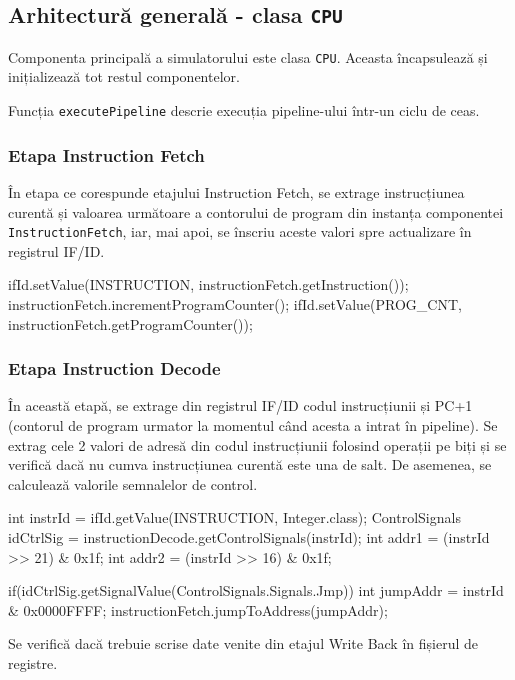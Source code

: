 \documentclass{article}
\begin{document}
\subsection{Arhitectură generală - clasa \texttt{CPU}}
Componenta principală a simulatorului este clasa \texttt{CPU}. Aceasta încapsulează și inițializează tot restul componentelor. 

Funcția \texttt{executePipeline} descrie execuția pipeline-ului într-un ciclu de ceas. 

\subsubsection{Etapa Instruction Fetch}
În etapa ce corespunde etajului Instruction Fetch, se extrage instrucțiunea curentă și valoarea următoare a contorului de program din instanța componentei \texttt{InstructionFetch}, iar, mai apoi, se înscriu aceste valori  spre actualizare în registrul IF/ID.

\begin{javacodebox}[Etajul If]
ifId.setValue(INSTRUCTION, instructionFetch.getInstruction());
instructionFetch.incrementProgramCounter();
ifId.setValue(PROG_CNT, instructionFetch.getProgramCounter());
\end{javacodebox}

\subsubsection{Etapa Instruction Decode}
În această etapă, se extrage din registrul IF/ID codul instrucțiunii și PC+1 (contorul de program urmator la momentul când acesta a intrat în pipeline).
Se extrag cele 2 valori de adresă din codul instrucțiunii folosind operații pe biți și se verifică dacă nu cumva instrucțiunea curentă este una de salt. De asemenea, se calculează valorile semnalelor de control.

\begin{javacodebox}
int instrId = ifId.getValue(INSTRUCTION, Integer.class);
ControlSignals idCtrlSig = instructionDecode.getControlSignals(instrId);
int addr1 = (instrId >> 21) & 0x1f;
int addr2 = (instrId >> 16) & 0x1f;

if(idCtrlSig.getSignalValue(ControlSignals.Signals.Jmp)) {
    int jumpAddr = instrId & 0x0000FFFF;
    instructionFetch.jumpToAddress(jumpAddr);
}
\end{javacodebox}

Se verifică dacă trebuie scrise date venite din etajul Write Back în fișierul de registre.
\end{document}
